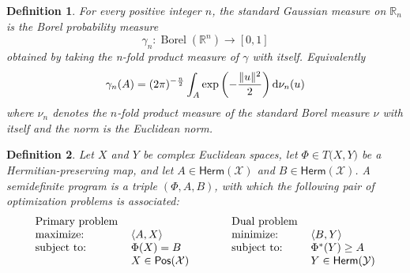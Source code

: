 \documentclass[aps,pra,onecolumn,notitlepage,superscriptaddress]{revtex4-1}
\newcommand{\R}{\mathbb{R}}
\newcommand{\spc}[1]{\mathcal{#1}}
\def\d{{\rm d}}
\newcommand{\Pos}{\mathsf{Pos}}
\newcommand{\Herm}{\mathsf{Herm}}
\def\>{\rangle}
\def\<{\langle}
\newcommand{\op}[1]{\operatorname{#1}}
\newtheorem{defi}{Definition}
\begin{document}
    \begin{defi}
        For every positive integer $n$, the standard Gaussian measure on $\R_n$ is the Borel probability measure
        \begin{equation}
            \gamma_n : \op{Borel}(\R^n) \to [0,1]
        \end{equation}
        obtained by taking the n-fold product measure of $\gamma$ with itself. Equivalently
        \begin{equation}
            \gamma_n(A) = (2\pi)^{-\frac{n}{2}} \int_A \exp \left( -\frac{\Vert u \Vert^2}{2} \right) \d \nu_n(u)
        \end{equation}
        where $\nu_n$ denotes the $n$-fold product measure of the standard Borel measure $\nu$ with itself and the norm is the Euclidean norm.
    \end{defi}

    \begin{defi}
        Let $X$ and $Y$ be complex Euclidean spaces, let $\Phi \in T\spc (X\spc ,Y)$ be a Hermitian-preserving map, and let $A \in \Herm(\spc X)$ and $B \in \Herm(\spc X)$. A semidefinite program is a triple $(\Phi,A,B)$, with which the following pair of optimization problems is associated:
        \begin{equation}
            \begin{tabular}{ll}
                Primary problem & \\
                maximize: & $\< A,X \>$ \\
                subject to: & $\Phi(X) = B$ \\
                & $X \in \Pos(\mathcal{X})$
            \end{tabular}
            \ \ \ \ \ \ \ \ 
            \begin{tabular}{ll}
                Dual problem & \\
                minimize: & $\< B,Y \>$ \\
                subject to: & $\Phi^*(Y) \geq A$ \\
                & $Y \in \Herm(\mathcal{Y})$
            \end{tabular}
        \end{equation}
    \end{defi}
\end{document}
